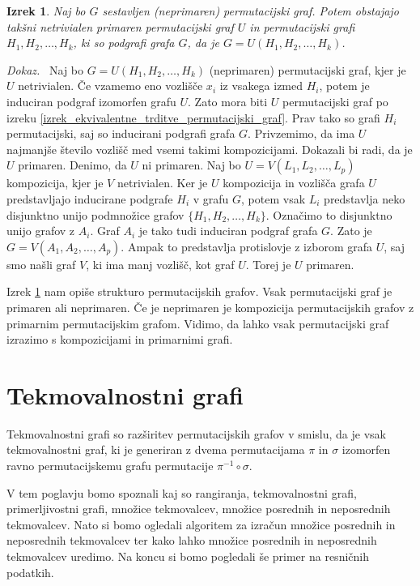 \documentclass[a4paper, 12pt]{book}
\newtheorem{izrek}{Izrek}[chapter]
\newenvironment{dokaz}{\emph{Dokaz.}\ }{\hspace{\fill}{$\Box$}}
\begin{document}
\begin{izrek}
\label{izrek_neprimaren_graf_je_kompozicija_z_primarnim}
    Naj bo $G$ sestavljen (neprimaren) permutacijski graf. Potem obstajajo takšni netrivialen primaren permutacijski graf $U$ in permutacijski grafi $H_1, H_2, \dots, H_k$, ki so podgrafi grafa $G$, da je $G = U(H_1, H_2, \dots, H_k)$.
\end{izrek}
\begin{dokaz}
    Naj bo $G = U(H_1, H_2, \dots, H_k)$ (neprimaren) permutacijski graf, kjer je $U$ netrivialen. Če vzamemo eno vozlišče $x_i$ iz vsakega izmed $H_i$, potem je induciran podgraf izomorfen grafu $U$. Zato mora biti $U$ permutacijski graf po izreku \ref{izrek_ekvivalentne_trditve_permutacijski_graf}. Prav tako so grafi $H_i$ permutacijski, saj so inducirani podgrafi grafa $G$. Privzemimo, da ima $U$ najmanjše število vozlišč med vsemi takimi kompozicijami. Dokazali bi radi, da je $U$ primaren. Denimo, da $U$ ni primaren. Naj bo $U = V(L_1, L_2, \dots, L_p)$ kompozicija, kjer je $V$ netrivialen. Ker je $U$ kompozicija in vozlišča grafa $U$ predstavljajo inducirane podgrafe $H_i$ v grafu $G$, potem vsak $L_i$ predstavlja neko disjunktno unijo podmnožice grafov $\{ H_1, H_2, \dots, H_k \}$. Označimo to disjunktno unijo grafov z $A_i$. Graf $A_i$ je tako tudi induciran podgraf grafa $G$. Zato je $G = V(A_1, A_2, \dots, A_p)$. Ampak to predstavlja protislovje z izborom grafa $U$, saj smo našli graf $V$, ki ima manj vozlišč, kot graf $U$. Torej je $U$ primaren.
\end{dokaz}

Izrek \ref{izrek_neprimaren_graf_je_kompozicija_z_primarnim} nam opiše strukturo permutacijskih grafov. Vsak permutacijski graf je primaren ali neprimaren. Če je neprimaren je kompozicija permutacijskih grafov z primarnim permutacijskim grafom. Vidimo, da lahko vsak permutacijski graf izrazimo s kompozicijami in primarnimi grafi.

\chapter{ Tekmovalnostni grafi }

Tekmovalnostni grafi so razširitev permutacijskih grafov v smislu, da je vsak tekmovalnostni graf, ki je generiran z dvema permutacijama $\pi$ in $\sigma$ izomorfen ravno permutacijskemu grafu permutacije $\pi^{-1} \circ \sigma$. 

V tem poglavju bomo spoznali kaj so rangiranja, tekmovalnostni grafi, primerljivostni grafi, množice tekmovalcev, množice posrednih in neposrednih tekmovalcev. Nato si bomo ogledali algoritem za izračun množice posrednih in neposrednih tekmovalcev ter kako lahko množice posrednih in neposrednih tekmovalcev uredimo. Na koncu si bomo pogledali še primer na resničnih podatkih.
\end{document}

